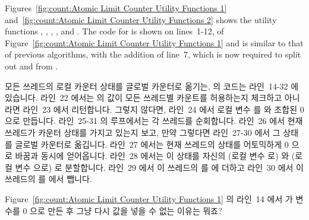 Figures~\ref{fig:count:Atomic Limit Counter Utility Functions 1}
and~\ref{fig:count:Atomic Limit Counter Utility Functions 2}
shows the utility functions
,
,
,
, and
.
The code for  is shown on lines~1-12,
of Figure~\ref{fig:count:Atomic Limit Counter Utility Functions 1} and
is similar to that of previous algorithms, with the addition of
line~7, which is now required to split out  and
 from .
\fi

모든 쓰레드의 로컬 카운터 상태를 글로벌 카운터로 옮기는,
 의 코드는 라인~14-32 에 있습니다.
라인~22 에서는  의 값이 모든 쓰레드별 카운트를 허용하는지
체크하고 아니라면 라인~23 에서 리턴합니다.
그렇지 않다면, 라인~24 에서 로컬 변수  를  와
 조합된 0으로 만듭니다.
라인~25-31 의 루프에서는 각 쓰레드를 순회합니다.
라인~26 에서 현재 쓰레드가 카운터 상태를 가지고 있는지 보고, 만약 그렇다면
라인~27-30 에서 그 상태를 글로벌 카운터로 옮깁니다.
라인~27 에서는 현재 쓰레드의 상태를 어토믹하게 0 으로 바꿈과 동시에 얻어옵니다.
라인~28 에서는 이 상태를 자신의  (로컬 변수  로) 와
 (로컬 변수  으로) 로 분할합니다.
라인~29 에서 이 쓰레드의  를  에 더하고 라인~30
에서 이 쓰레드의  를  에서 뺍니다.

\QuickQuiz{}
	Figure~\ref{fig:count:Atomic Limit Counter Utility Functions 1} 의
	라인~14 에서  가  변수를 0 으로
	만든 후 그냥 다시 값을 넣을 수 없는 이유는 뭐죠?
	\iffalse


